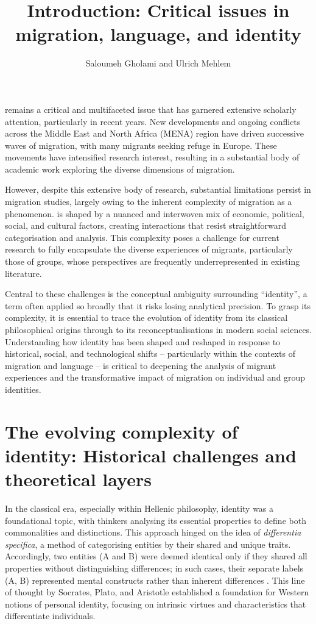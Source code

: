 \documentclass[output=paper,colorlinks,citecolor=brown]{langscibook}
\author{Saloumeh Gholami\orcid{}\affiliation{Cambridge University} and Ulrich Mehlem\orcid{}\affiliation{Goethe Universität Frankfurt}}
\title{Introduction: Critical issues in migration, language, and identity}
\begin{document}
\maketitle

 remains a critical and multifaceted issue that has garnered extensive scholarly attention, particularly in recent years. New developments and ongoing conflicts across the Middle East and North Africa (MENA) region have driven successive waves of migration, with many migrants seeking refuge in Europe. These movements have intensified research interest, resulting in a substantial body of academic work exploring the diverse dimensions of migration.
\largerpage

However, despite this extensive body of research, substantial limitations persist in migration studies, largely owing to the inherent complexity of migration as a phenomenon.  is shaped by a nuanced and interwoven mix of economic, political, social, and cultural factors, creating interactions that resist straightforward categorisation and analysis. This complexity poses a challenge for current research to fully encapsulate the diverse experiences of migrants, particularly those of  groups, whose perspectives are frequently underrepresented in existing literature.

Central to these challenges is the conceptual ambiguity surrounding ``identity'', a term often applied so broadly that it risks losing analytical precision. To grasp its complexity, it is essential to trace the evolution of identity from its classical philosophical origins through to its reconceptualisations in modern social sciences. Understanding how identity has been shaped and reshaped in response to historical, social, and technological shifts -- particularly within the contexts of migration and language -- is critical to deepening the analysis of migrant experiences and the transformative impact of migration on individual and group identities.

\section{The evolving complexity of identity: Historical challenges and theoretical layers}\label{Intro.ss.1}

In the classical era, especially within Hellenic philosophy, identity was a foundational topic, with thinkers analysing its essential properties to define both commonalities and distinctions. This approach hinged on the idea of \textit{differentia specifica}, a method of categorising entities by their shared and unique traits. Accordingly, two entities (A and B) were deemed identical only if they shared all properties without distinguishing differences; in such cases, their separate labels (A, B) represented mental constructs rather than inherent differences \citep{windelband1910}. This line of thought by Socrates, Plato, and Aristotle established a foundation for Western notions of personal identity, focusing on intrinsic virtues and characteristics that differentiate individuals.
\largerpage
\end{document}
